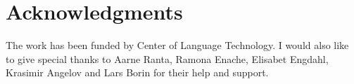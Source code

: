 \documentclass[submission]{eptcs} %
\begin{document}
\section{Acknowledgments}
The work has been funded by Center of Language Technology.
I would also like to give special thanks to Aarne Ranta, Ramona Enache,
Elisabet Engdahl, Krasimir Angelov and Lars Borin for their help and support.



\nocite{*}


\end{document}
